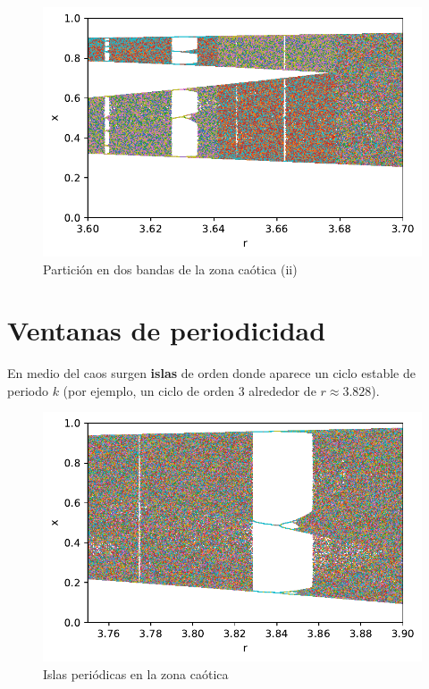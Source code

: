 \documentclass[
  10pt,
  a4paper,
  DIV=11,
  numbers=noendperiod,
  open=any]{scrreprt}
\numberwithin{equation}{chapter}
\numberwithin{equation}{section}
\renewcommand{\[}{\begin{equation}}
\renewcommand{\]}{\end{equation}}
\begin{document}
\begin{figure}[h]
  \centering
  \includegraphics[keepaspectratio]{01-logistica/Caos_files/figure-pdf/cell-3-output-1.pdf}
  \caption{Partición en dos bandas de la zona caótica (ii)}
\end{figure}


\section{Ventanas de periodicidad}\label{ventanas-de-periodicidad}

En medio del caos surgen \textbf{islas} de orden donde aparece un ciclo
estable de periodo \(k\) (por ejemplo, un ciclo de orden 3 alrededor de
\(r\approx3.828\)).

\begin{figure}[h]
  \centering
  \includegraphics[keepaspectratio]{01-logistica/Caos_files/figure-pdf/cell-4-output-1.pdf}
  \caption{Islas periódicas en la zona caótica}
\end{figure}
\end{document}
